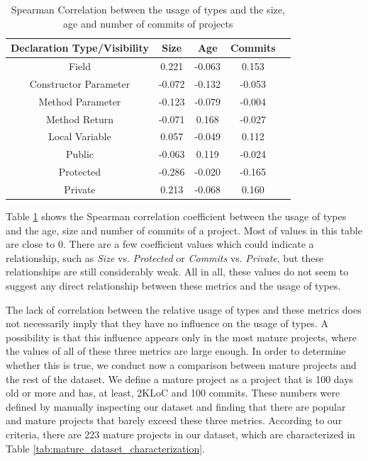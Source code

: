 \documentclass[msc]{ppgccufmg}
\begin{document}
\begin{table}[h!]

\centering{}%
\begin{tabular}{|c|c|c|c|c|}
\hline 
Declaration Type/Visibility	& Size		& Age	&	Commits\\
\hline 
\hline 
Field						&  0.221	& -0.063	&  0.153	\\ \hline
Constructor Parameter		& -0.072	& -0.132	& -0.053	\\ \hline
Method Parameter			& -0.123	& -0.079	& -0.004	\\ \hline
Method Return				& -0.071	&  0.168	& -0.027	\\ \hline
Local Variable		 		&  0.057	& -0.049	&  0.112	\\ 
\hline 			 
\hline 		 
Public						& -0.063	&   0.119	& -0.024	\\ \hline
Protected					& -0.286	&  -0.020	& -0.165	\\ \hline
Private				 		&  0.213	&  -0.068	&  0.160	\\ \hline
\end{tabular}
\caption{Spearman Correlation between the usage of types and the size, age and number of commits of projects}
\label{tab:all_correlation_maturity}
\end{table}	

Table \ref{tab:all_correlation_maturity} shows the Spearman correlation coefficient between the usage of types and the age, size and number of commits of a project.
Most of values in this table are close to 0.
There are a few coefficient values which could indicate a relationship, such as \emph{Size} vs. \emph{Protected} or \emph{Commits} vs. \emph{Private}, but these relationships are still considerably weak.
All in all, these values do not seem to suggest any direct relationship between these metrics and the usage of types.

The lack of correlation between the relative usage of types and these metrics does not necessarily imply that they have no influence on the usage of types.
A possibility is that this influence appears only in the most mature projects, where the values of all of these three metrics are large enough.
In order to determine whether this is true, we conduct now a comparison between mature projects and the rest of the dataset.
We define a mature project as a project that is 100 days old or more and has, at least, 2KLoC and 100 commits.
These numbers were defined by manually inspecting our dataset and finding that there are popular and mature projects that barely exceed these three metrics.
According to our criteria, there are 223 mature projects in our dataset, which are characterized in Table \ref{tab:mature_dataset_characterization}.
\end{document}
